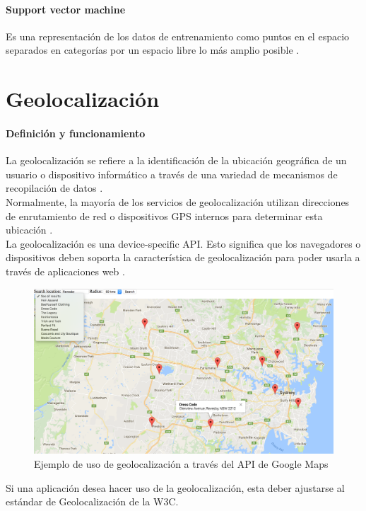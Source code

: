 \paragraph{Support vector machine} Es una representación de los datos de entrenamiento como puntos en el espacio separados en categorías por un espacio libre lo más amplio posible \citep{MarcoTeorico12}.

\section{Geolocalización}
\paragraph{Definición y funcionamiento}La geolocalización se refiere a la identificación de la ubicación geográfica de un usuario o dispositivo informático a través de una variedad de mecanismos de recopilación de datos \citep{MarcoTeorico14}.
\\
Normalmente, la mayoría de los servicios de geolocalización utilizan direcciones de enrutamiento de red o dispositivos GPS internos para determinar esta ubicación \citep{MarcoTeorico14}.
\\
La geolocalización es una device-specific API. Esto significa que los navegadores o dispositivos deben soporta la característica de geolocalización para poder usarla a través de aplicaciones web \citep{MarcoTeorico14}.

\begin{figure}[H]
	\centering
	\includegraphics[scale=.1]{Capitulo2/images/geolocation}
	\caption{Ejemplo de uso de geolocalización a través del API de Google Maps}
	\label{fig:geolocation}
\end{figure}

Si una aplicación desea hacer uso de la geolocalización, esta deber ajustarse al estándar de Geolocalización de la W3C.


